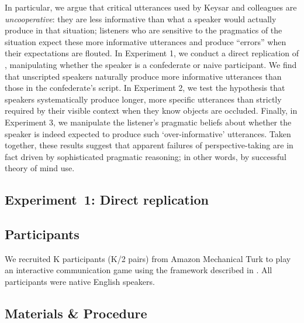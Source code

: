\documentclass[manuscript]{stjour}
\begin{document}
In particular, we argue that critical utterances used by Keysar and colleagues are \emph{uncooperative}: they are less informative than what a speaker would actually produce in that situation; listeners who are sensitive to the pragmatics of the situation expect these more informative utterances and produce ``errors'' when their expectations are flouted. In Experiment 1, we conduct a direct replication of \cite{KeysarLinBarr03_LimitsOnTheoryOfMindUse}, manipulating whether the speaker is a confederate or naive participant. We find that unscripted speakers naturally produce more informative utterances than those in the confederate's script. In Experiment 2, we test the hypothesis that speakers systematically produce longer, more specific utterances than strictly required by their visible context when they know objects are occluded. Finally, in Experiment 3, we manipulate the listener's pragmatic beliefs about whether the speaker is indeed expected to produce such `over-informative' utterances. Taken together, these results suggest that apparent failures of perspective-taking are in fact driven by sophisticated pragmatic reasoning; in other words, by successful theory of mind use.

\subsection{Experiment~1: Direct replication}
\label{sec:Exp1}

\subsection{Participants}

We recruited K participants (K/2 pairs) from Amazon Mechanical Turk to play an interactive communication game using the framework described in \cite{Hawkins15_RealTimeWebExperiments}. All participants were native English speakers. %

\subsection{Materials \& Procedure}
\end{document}
